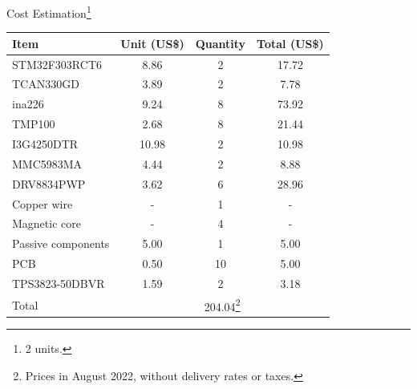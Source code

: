 \documentclass{beamer}
\begin{document}
\begin{frame}{Cost Estimation\footnote{2 units.}}

\begin{table}[!htb]\scriptsize
    \centering
    \label{tab:cost-estimation}
    \begin{tabular}{lccc}
        \toprule[1.5pt]
        \textbf{Item} & \textbf{Unit (US\$)} & \textbf{Quantity} & \textbf{Total (US\$)} \\
        \midrule
        STM32F303RCT6         & 8.86     & 2  & 17.72  \\
        TCAN330GD             & 3.89  & 2  & 7.78 \\
        ina226                & 9.24  & 8  & 73.92\\
        TMP100                & 2.68  & 8  & 21.44\\
        I3G4250DTR            & 10.98 & 2  & 10.98 \\
        MMC5983MA             & 4.44  & 2  & 8.88 \\
        DRV8834PWP            & 3.62  & 6  & 28.96 \\
        Copper wire           & -     & 1  & - \\
        Magnetic core         & -     & 4  & - \\
        Passive components    & 5.00  & 1  & 5.00 \\
        PCB                   & 0.50  & 10 & 5.00 \\
        TPS3823-50DBVR        & 1.59  & 2 & 3.18 \\
        \midrule
        Total          & \multicolumn{3}{c}{204.04\footnote{Prices in August 2022, without delivery rates or taxes.}} \\
        \bottomrule[1.5pt]
    \end{tabular}
\end{table}

\end{frame}

\end{document}
